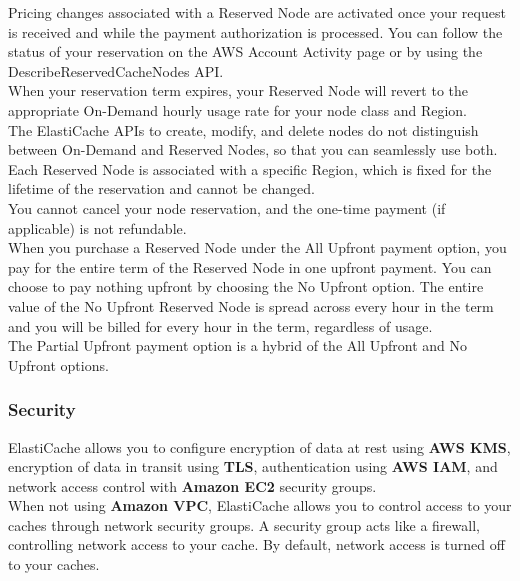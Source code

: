 \documentclass[12pt, letterpaper, twoside]{article}
\begin{document}
Pricing changes associated with a Reserved Node are activated once your request is received and while the payment authorization 
is processed. You can follow the status of your reservation on the AWS Account Activity page or by using the 
DescribeReservedCacheNodes API.\\

When your reservation term expires, your Reserved Node will revert to the appropriate On-Demand hourly usage rate for your node 
class and Region.\\

The ElastiCache APIs to create, modify, and delete nodes do not distinguish between On-Demand and Reserved Nodes, so that you 
can seamlessly use both.\\

Each Reserved Node is associated with a specific Region, which is fixed for the lifetime of the reservation and cannot 
be changed.\\

You cannot cancel your node reservation, and the one-time payment (if applicable) is not refundable.\\

When you purchase a Reserved Node under the All Upfront payment option, you pay for the entire term of the Reserved Node 
in one upfront payment. You can choose to pay nothing upfront by choosing the No Upfront option. The entire value of the 
No Upfront Reserved Node is spread across every hour in the term and you will be billed for every hour in the term, regardless 
of usage.\\
The Partial Upfront payment option is a hybrid of the All Upfront and No Upfront options.\\

\subsubsection{Security}
ElastiCache allows you to configure encryption of data at rest using \textbf{AWS KMS}, encryption of 
data in transit using \textbf{TLS}, authentication using \textbf{AWS IAM}, 
and network access control with \textbf{Amazon EC2} security groups.\\

When not using \textbf{Amazon VPC}, ElastiCache allows you to control access to your caches 
through network security groups. A security group acts like a firewall, controlling network access to your cache. 
By default, network access is turned off to your caches.\\
\end{document}
